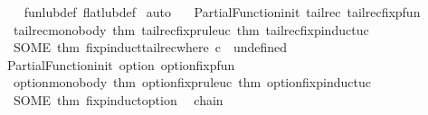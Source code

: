 \begin{isabellebody}
\ \ \isamarkupfalse%
\ fun{\isacharunderscore}{\kern0pt}lub{\isacharunderscore}{\kern0pt}def\ flat{\isacharunderscore}{\kern0pt}lub{\isacharunderscore}{\kern0pt}def\ \isamarkupfalse%
{\isacharparenleft}{\kern0pt}auto\ {}\ {}{\isacharparenright}{\kern0pt}%
\endisatagproof
{\isafoldproof}%
%
\isadelimproof
\isanewline
%
\endisadelimproof
%
\isadelimML
\isanewline
%
\endisadelimML
%
\isatagML
{}\isamarkupfalse%
\ {\isacartoucheopen}Partial{\isacharunderscore}{\kern0pt}Function{\isachardot}{\kern0pt}init\ {\isachardoublequote}{\kern0pt}tailrec{\isachardoublequote}{\kern0pt}\ \isactrlterm {\isasymopen}tailrec{\isachardot}{\kern0pt}fixp{\isacharunderscore}{\kern0pt}fun{\isasymclose}\isanewline
\ \ \isactrlterm {\isasymopen}tailrec{\isachardot}{\kern0pt}mono{\isacharunderscore}{\kern0pt}body{\isasymclose}\ {\isacharat}{\kern0pt}{\isacharbraceleft}{\kern0pt}thm\ tailrec{\isachardot}{\kern0pt}fixp{\isacharunderscore}{\kern0pt}rule{\isacharunderscore}{\kern0pt}uc{\isacharbraceright}{\kern0pt}\ {\isacharat}{\kern0pt}{\isacharbraceleft}{\kern0pt}thm\ tailrec{\isachardot}{\kern0pt}fixp{\isacharunderscore}{\kern0pt}induct{\isacharunderscore}{\kern0pt}uc{\isacharbraceright}{\kern0pt}\isanewline
\ \ {\isacharparenleft}{\kern0pt}SOME\ {\isacharat}{\kern0pt}{\isacharbraceleft}{\kern0pt}thm\ fixp{\isacharunderscore}{\kern0pt}induct{\isacharunderscore}{\kern0pt}tailrec{\isacharbrackleft}{\kern0pt}where\ c\ {\isacharequal}{\kern0pt}\ undefined{\isacharbrackright}{\kern0pt}{\isacharbraceright}{\kern0pt}{\isacharparenright}{\kern0pt}{\isacartoucheclose}\isanewline
\isanewline
{}\isamarkupfalse%
\ {\isacartoucheopen}Partial{\isacharunderscore}{\kern0pt}Function{\isachardot}{\kern0pt}init\ {\isachardoublequote}{\kern0pt}option{\isachardoublequote}{\kern0pt}\ \isactrlterm {\isasymopen}option{\isachardot}{\kern0pt}fixp{\isacharunderscore}{\kern0pt}fun{\isasymclose}\isanewline
\ \ \isactrlterm {\isasymopen}option{\isachardot}{\kern0pt}mono{\isacharunderscore}{\kern0pt}body{\isasymclose}\ {\isacharat}{\kern0pt}{\isacharbraceleft}{\kern0pt}thm\ option{\isachardot}{\kern0pt}fixp{\isacharunderscore}{\kern0pt}rule{\isacharunderscore}{\kern0pt}uc{\isacharbraceright}{\kern0pt}\ {\isacharat}{\kern0pt}{\isacharbraceleft}{\kern0pt}thm\ option{\isachardot}{\kern0pt}fixp{\isacharunderscore}{\kern0pt}induct{\isacharunderscore}{\kern0pt}uc{\isacharbraceright}{\kern0pt}\isanewline
\ \ {\isacharparenleft}{\kern0pt}SOME\ {\isacharat}{\kern0pt}{\isacharbraceleft}{\kern0pt}thm\ fixp{\isacharunderscore}{\kern0pt}induct{\isacharunderscore}{\kern0pt}option{\isacharbraceright}{\kern0pt}{\isacharparenright}{\kern0pt}{\isacartoucheclose}%
\endisatagML
{\isafoldML}%
%
\isadelimML
\isanewline
%
\endisadelimML
\isanewline
{}\isamarkupfalse%
\ {\isacharparenleft}{\kern0pt}\ chain\isanewline
%
\isadelimtheory
\isanewline
%
\endisadelimtheory
%
\isatagtheory
{}\isamarkupfalse%
%
\endisatagtheory
{\isafoldtheory}%
%
\isadelimtheory
%
\endisadelimtheory
%
\end{isabellebody}%
